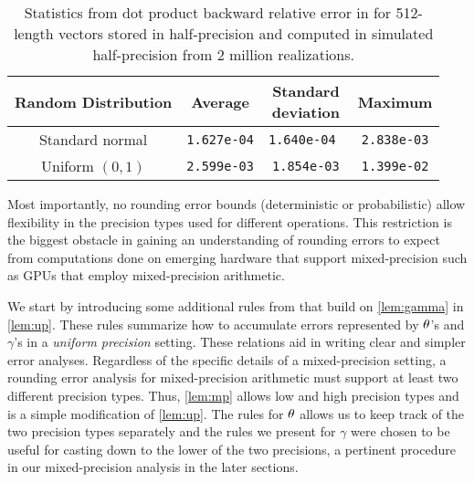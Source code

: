 \begin{table}
	\centering
	\begin{tabular}{||c|c|c|c||} 
		\hline
		Random Distribution & Average & \makecell{Standard\\deviation}& Maximum\\ \hline
		Standard normal &{\tt 1.627e-04} & {\tt 1.640e-04 } & {\tt 2.838e-03}\\ \hline
		Uniform $(0,1)$ & {\tt 2.599e-03}& {\tt 1.854e-03} & {\tt 1.399e-02}\\ \hline
	\end{tabular}
	\caption{Statistics from dot product backward relative error in for 512-length vectors stored in half-precision and computed in simulated half-precision from 2 million realizations.}
	\label{table:HPdoterr}
\end{table}

Most importantly, no rounding error bounds (deterministic or probabilistic) allow flexibility in the precision types used for different operations. 
This restriction is the biggest obstacle in gaining an understanding of rounding errors to expect from computations done on emerging hardware that support mixed-precision such as GPUs that employ mixed-precision arithmetic.

We start by introducing some additional rules from \cite{Higham2002} that build on \cref{lem:gamma} in \cref{lem:up}. 
These rules summarize how to accumulate errors represented by $\theta$'s and $\gamma$'s in a \emph{uniform precision} setting.
These relations aid in writing clear and simpler error analyses.
Regardless of the specific details of a mixed-precision setting, a rounding error analysis for mixed-precision arithmetic must support at least two different precision types. 
Thus, \cref{lem:mp} allows low and high precision types and is a simple modification of \cref{lem:up}.
The rules for $\theta$ allows us to keep track of the two precision types separately and the rules we present for $\gamma$ were chosen to be useful for casting down to the lower of the two precisions, a pertinent procedure in our mixed-precision analysis in the later sections. 

